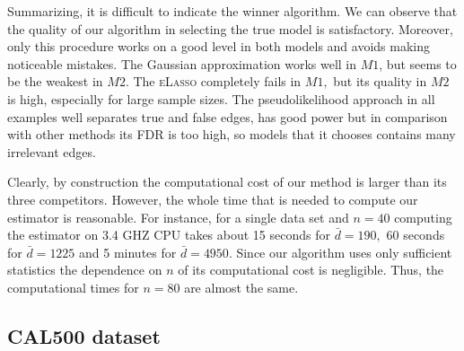 \documentclass[twoside,11pt]{article}
\begin{document}
Summarizing, it is difficult to indicate the winner algorithm. We can observe that the quality of our algorithm  in selecting  the true model is satisfactory. Moreover, only this procedure works on a good level in both models and avoids making noticeable  mistakes.  The Gaussian approximation works well in  $M1$, but seems to be the weakest in  $M2$. The \textsc{eLasso}  completely fails in  $M1,$ but its quality in $M2$    is high, especially for  large sample sizes. The pseudolikelihood approach in all examples well separates true and false edges, has good power but in comparison with other methods 
its FDR is too high, so models that it chooses contains many irrelevant edges. 




 
 Clearly, by construction the computational cost of our method is larger than
its three competitors. However, the whole time that is needed to compute our estimator is reasonable. 
For instance, for a single data set and $n=40$ computing the estimator on 3.4 GHZ CPU takes about 15 seconds for $\bar{d} = 190,$ 60 seconds for $\bar{d} = 1225$ 
and 5 minutes for $\bar{d} = 4950.$ Since our algorithm uses only sufficient statistics the dependence on $n$ of its computational cost is negligible. Thus, the computational times for $n=80$ are almost the same. 



\subsection{CAL500 dataset}\label{CAL500}
\end{document}
